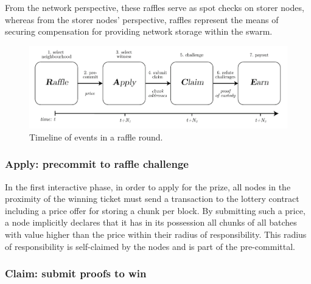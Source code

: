 From the network perspective, these raffles serve as spot checks on storer nodes, whereas from the storer nodes' perspective, raffles represent the means of securing compensation for providing network storage within the swarm. 


\begin{figure}[htbp]
  \centering
  \includegraphics[width=\textwidth]{fig/postage_race.pdf}
  \caption[Timeline of events in a raffle round \statusgreen]{Timeline of events in a raffle round.}
  \label{fig:raffle-timeline}
\end{figure}


\subsubsection{Apply: precommit to raffle challenge}

In the first interactive phase, in order to apply for the prize, all nodes in the proximity of the winning ticket must send a transaction to the lottery contract including a price offer for storing a chunk per block. By submitting such a price, a node implicitly declares that it has in its possession all chunks of all batches with value higher than the price within their radius of responsibility. This radius of responsibility is self-claimed by the nodes and is part of the pre-committal. 


\subsubsection{Claim: submit proofs to win}

